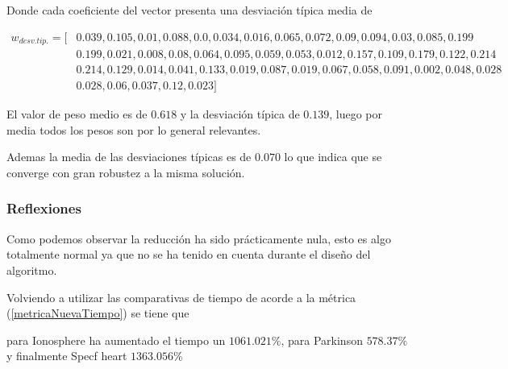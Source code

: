 Donde cada coeficiente del vector presenta una desviación típica media de 

\begin{align*}
  w_{desv. tip.} = [ 
    &  0.039,0.105, 0.01, 0.088, 0.0, 0.034, 0.016, 0.065, 0.072, 0.09, 0.094, 0.03, 0.085, 0.199  \\
    &  0.199, 0.021, 0.008, 0.08, 0.064, 0.095, 0.059, 0.053, 0.012, 0.157, 0.109, 0.179, 0.122, 0.214  \\
    &  0.214, 0.129, 0.014, 0.041, 0.133, 0.019, 0.087, 0.019, 0.067, 0.058, 0.091, 0.002, 0.048, 0.028  \\
    &  0.028, 0.06, 0.037, 0.12, 0.023 
   ]
\end{align*}

El valor de peso medio es de $0.618$ y la desviación típica de $0.139$, luego por media todos los pesos son por lo general relevantes. 

Ademas la media de las desviaciones típicas es de $0.070$ lo que indica que se converge con gran robustez a la misma solución.

\subsubsection*{Reflexiones}

Como podemos observar la reducción ha sido prácticamente nula, esto es algo totalmente 
normal ya que no se ha tenido en cuenta durante el diseño del algoritmo.

Volviendo a utilizar las comparativas de tiempo 
de acorde a la métrica (\ref{metricaNuevaTiempo}) se tiene que 

para Ionosphere ha aumentado el tiempo un $1061.021 \%$, para 
Parkinson $578.37 \%$ y finalmente 
Specf heart $1363.056 \%$  

